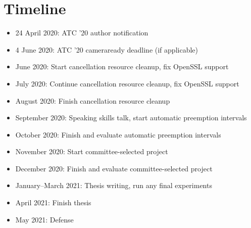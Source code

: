 \documentclass[12pt,letterpaper,openright]{report}
\begin{document}
\section{Timeline}

\begin{itemize}
\item 24 April 2020: ATC '20 author notification
\item 4 June 2020: ATC '20 cameraready deadline (if applicable)
\item June 2020: Start cancellation resource cleanup, fix OpenSSL support
\item July 2020: Continue cancellation resource cleanup, fix OpenSSL support
\item August 2020: Finish cancellation resource cleanup
\item September 2020: Speaking skills talk, start automatic preemption intervals
\item October 2020: Finish and evaluate automatic preemption intervals
\item November 2020: Start committee-selected project
\item December 2020: Finish and evaluate committee-selected project
\item January--March 2021: Thesis writing, run any final experiments
\item April 2021: Finish thesis
\item May 2021: Defense
\end{itemize}


\newpage
{}

\end{document}
